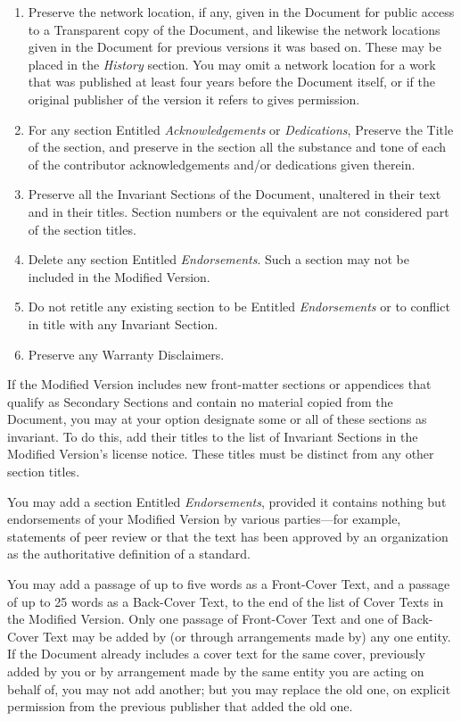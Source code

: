 \begin{enumerate}
\item Preserve the network location, if any, given in the Document for
  public access to a Transparent copy of the Document, and likewise
  the network locations given in the Document for previous versions it
  was based on.  These may be placed in the \emph{History} section.
  You may omit a network location for a work that was published at
  least four years before the Document itself, or if the original
  publisher of the version it refers to gives permission.
   
\item For any section Entitled \emph{Acknowledgements} or
  \emph{Dedications}, Preserve the Title of the section, and preserve
  in the section all the substance and tone of each of the contributor
  acknowledgements and/or dedications given therein.
   
\item Preserve all the Invariant Sections of the Document, unaltered
  in their text and in their titles.  Section numbers or the
  equivalent are not considered part of the section titles.
   
\item Delete any section Entitled \emph{Endorsements}.  Such a section
  may not be included in the Modified Version.
   
\item Do not retitle any existing section to be Entitled
  \emph{Endorsements} or to conflict in title with any Invariant
  Section.
   
\item Preserve any Warranty Disclaimers.
\end{enumerate}

If the Modified Version includes new front-matter sections or
appendices that qualify as Secondary Sections and contain no material
copied from the Document, you may at your option designate some or all
of these sections as invariant.  To do this, add their titles to the
list of Invariant Sections in the Modified Version's license notice.
These titles must be distinct from any other section titles.

You may add a section Entitled \emph{Endorsements}, provided it
contains nothing but endorsements of your Modified Version by various
parties---for example, statements of peer review or that the text has
been approved by an organization as the authoritative definition of a
standard.

You may add a passage of up to five words as a Front-Cover Text, and a
passage of up to 25 words as a Back-Cover Text, to the end of the list
of Cover Texts in the Modified Version.  Only one passage of
Front-Cover Text and one of Back-Cover Text may be added by (or
through arrangements made by) any one entity.  If the Document already
includes a cover text for the same cover, previously added by you or
by arrangement made by the same entity you are acting on behalf of,
you may not add another; but you may replace the old one, on explicit
permission from the previous publisher that added the old one.


